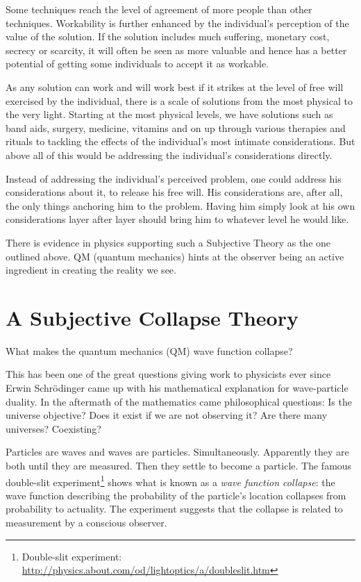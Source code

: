 \documentclass[11pt]{article}
\begin{document}
Some techniques reach the level of agreement of more people than other
techniques. Workability is further enhanced by the individual's perception of
the value of the solution. If the solution includes much suffering, monetary
cost, secrecy or scarcity, it will often be seen as more valuable and hence has a
better potential of getting some individuals to accept it as workable.

As any solution can work and will work best if it strikes at the level of free
will exercised by the individual, there is a scale of solutions from the most
physical to the very light. Starting at the most physical levels, we have
solutions such as band aids, surgery, medicine, vitamins and on up through
various therapies and rituals to tackling the effects of the individual's most
intimate considerations. But above all of this would be addressing the
individual's considerations directly.

Instead of addressing the individual's perceived problem, one could address his
considerations about it, to release his free will. His considerations are, after
all, the only things anchoring him to the problem. Having him simply look at his
own considerations layer after layer should bring him to whatever level he
would like. 

There is evidence in physics supporting such a Subjective Theory as the one
outlined above. QM (quantum mechanics) hints at the observer being an active
ingredient in creating the reality we see.

\newpage
\section{A Subjective Collapse Theory}

What makes the quantum mechanics (QM) wave function collapse?

This has been one of the great questions giving work to physicists ever since
Erwin Schr\"{o}dinger came up with his mathematical explanation for
wave-particle duality. In the aftermath of the mathematics came philosophical
questions: Is the universe objective? Does it exist if we are not observing
it? Are there many universes? Coexisting?

Particles are waves and waves are particles. Simultaneously. Apparently they
are both until they are measured. Then they settle to become a particle. 
The famous double-slit experiment\footnote{ Double-slit experiment:
\url{http://physics.about.com/od/lightoptics/a/doubleslit.htm}} shows what is
known as a {\em wave function collapse}: the wave function describing the
probability of the particle's location collapses from probability to actuality.
The experiment suggests that the collapse is related to measurement by a
conscious observer.
\end{document}
